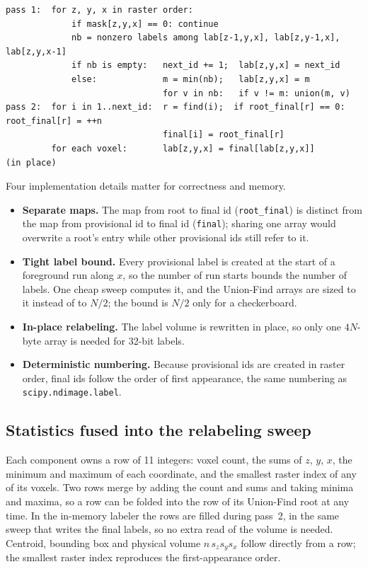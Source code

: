 \documentclass[11pt,a4paper]{article}
\begin{document}
\begin{lstlisting}[caption={Two-pass labeling (6-connectivity shown; 18 and 26 extend the causal set).},label={lst:twopass},float=t,captionpos=b,belowcaptionskip=2pt]
pass 1:  for z, y, x in raster order:
             if mask[z,y,x] == 0: continue
             nb = nonzero labels among lab[z-1,y,x], lab[z,y-1,x], lab[z,y,x-1]
             if nb is empty:   next_id += 1;  lab[z,y,x] = next_id
             else:             m = min(nb);   lab[z,y,x] = m
                               for v in nb:   if v != m: union(m, v)
pass 2:  for i in 1..next_id:  r = find(i);  if root_final[r] == 0: root_final[r] = ++n
                               final[i] = root_final[r]
         for each voxel:       lab[z,y,x] = final[lab[z,y,x]]       (in place)
\end{lstlisting}

Four implementation details matter for correctness and memory.
\begin{itemize}
  \item \textbf{Separate maps.} The map from root to final id (\texttt{root\_final}) is distinct from the map from provisional id to final id (\texttt{final}); sharing one array would overwrite a root's entry while other provisional ids still refer to it.
  \item \textbf{Tight label bound.} Every provisional label is created at the start of a foreground run along $x$, so the number of run starts bounds the number of labels. One cheap sweep computes it, and the Union-Find arrays are sized to it instead of to $N/2$; the bound is $N/2$ only for a checkerboard.
  \item \textbf{In-place relabeling.} The label volume is rewritten in place, so only one $4N$-byte array is needed for 32-bit labels.
  \item \textbf{Deterministic numbering.} Because provisional ids are created in raster order, final ids follow the order of first appearance, the same numbering as \texttt{scipy.ndimage.label}.
\end{itemize}

\subsection{Statistics fused into the relabeling sweep}
Each component owns a row of 11 integers: voxel count, the sums of $z$, $y$, $x$, the minimum and maximum of each coordinate, and the smallest raster index of any of its voxels. Two rows merge by adding the count and sums and taking minima and maxima, so a row can be folded into the row of its Union-Find root at any time. In the in-memory labeler the rows are filled during pass~2, in the same sweep that writes the final labels, so no extra read of the volume is needed. Centroid, bounding box and physical volume $n\,s_zs_ys_x$ follow directly from a row; the smallest raster index reproduces the first-appearance order.
\end{document}
